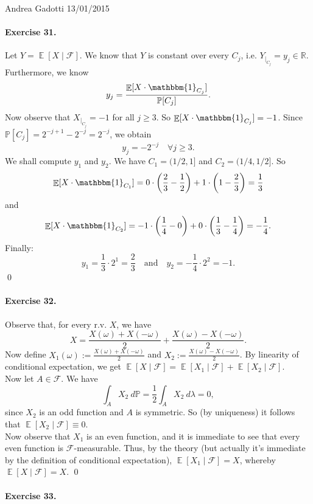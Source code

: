 \documentclass[12pt,a4paper]{report}
\theoremstyle{definition}
\theoremstyle{num.custom-title}
\DeclareMathOperator{\E}{\mathbb{E}}
\newcommand{\R}{\mathbb{R}}
\newcommand{\F}{\mathcal{F}}
\renewcommand{\P}{\mathbb{P}}
\renewcommand{\1}{\mathbbm{1}}
\begin{document}
\noindent Andrea Gadotti \hfill 13/01/2015

\paragraph{Exercise 31.} Let $Y=\E[X \mid \F]$. We know that $Y$ is constant over every $C_j$, i.e. $Y_{|_{C_j}} = y_j \in \R$. Furthermore, we know
\[
y_j = \frac{\E[X \cdot \1_{C_j}]}{\P[C_j]}.
\]
Now observe that $X_{|_{C_j}}= -1$ for all $j \geq 3$. So $\E[X \cdot \1_{C_j}] = -1$. Since $\P[C_j] = 2^{-j+1}-2^{-j} = 2^{-j}$, we obtain
\[
y_j = - 2^{-j} \quad \forall j \geq 3.
\]
We shall compute $y_1$ and $y_2$. We have $C_1 = (1/2,1]$ and $C_2 = (1/4,1/2]$. So
\[
\E[X \cdot \1_{C_1}] = 0 \cdot \left( \frac{2}{3}-\frac{1}{2} \right) + 1 \cdot \left( 1-\frac{2}{3} \right) = \frac{1}{3}
\]
and
\[
\E[X \cdot \1_{C_2}] = -1 \cdot \left( \frac{1}{4}-0 \right) + 0 \cdot \left( \frac{1}{3}-\frac{1}{4} \right) = -\frac{1}{4}.
\]
Finally:
\[
y_1 = \frac{1}{3} \cdot 2^1 = \frac{2}{3} \quad \text{and} \quad y_2 = -\frac{1}{4} \cdot 2^2 = -1.
\]
\qed

\paragraph{Exercise 32.} Observe that, for every r.v. $X$, we have
\[
X = \frac{X(\omega)+X(-\omega)}{2} + \frac{X(\omega)-X(-\omega)}{2}.
\]
Now define $X_1(\omega) := \frac{X(\omega)+X(-\omega)}{2}$ and $X_2 := \frac{X(\omega)-X(-\omega)}{2}$. By linearity of conditional expectation, we get
$\E[X \mid \F] = \E[X_1 \mid \F] + \E[X_2 \mid \F]$.\\
Now let $A \in \F$. We have
\[
\int_A X_2 \ d\P = \frac{1}{2} \int_A X_2 \ d\lambda = 0,
\]
since $X_2$ is an odd function and $A$ is symmetric. So (by uniqueness) it follows that $\E[X_2 \mid \F] \equiv 0$.\\
Now observe that $X_1$ is an even function, and it is immediate to see that every even function is $\F$-measurable.
Thus, by the theory (but actually it's immediate by the definition of conditional expectation), $\E[X_1 \mid \F] = X$, whereby $\E[X \mid \F] = X$. \qed

\paragraph{Exercise 33.}
\newcommand{\Y}{\mathcal{Y}}
\end{document}
